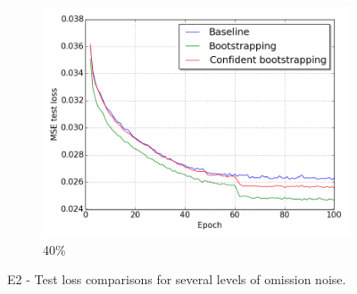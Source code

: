 \begin{figure}[H]
\begin{subfigure}{0.31\textwidth}
\end{subfigure}
\hspace*{\fill} %
\begin{subfigure}{0.31\textwidth}
\includegraphics[width=\textwidth]{figs/E2/lc_4.png}
\caption{40\%} \label{fig:app_E2_4_lc}
\vspace{0.1cm} %
\end{subfigure}
\caption{E2 - Test loss comparisons for several levels of omission noise.} \label{fig:E2_all_lc}
\end{figure}


